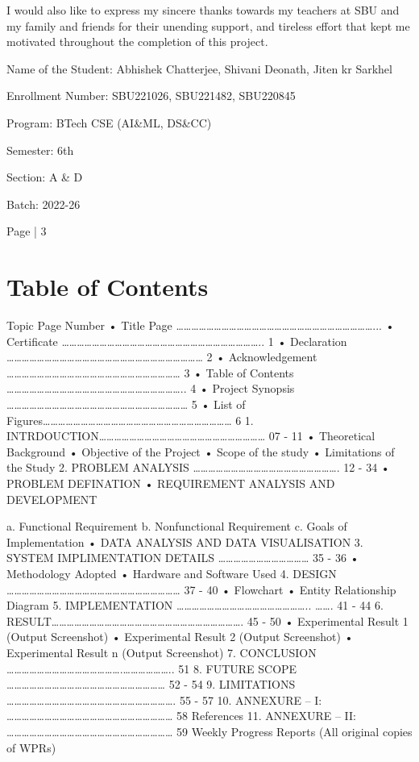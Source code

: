 \documentclass[11pt,a4paper]{article}
\begin{document}
I would also like to express my sincere thanks towards my teachers at SBU and my family and friends 
for their unending support, and tireless effort that kept me motivated throughout the completion of 
this project. 

Name of the Student:  Abhishek Chatterjee, Shivani Deonath, Jiten kr Sarkhel 

Enrollment Number:  SBU221026, SBU221482, SBU220845 

Program:  BTech CSE (AI\&ML, DS\&CC) 

Semester:  6th 

Section:  A \& D 

Batch:  2022-26 

Page | 3  

\newpage

\section*{Table of Contents }

{\large Topic  
          Page Number 
• Title Page ……………………………………………………………………...     
• Certificate ……………………………………………………………………..    1 
• Declaration ……………………………………………………………………    2 
• Acknowledgement ……………………………………………………………    3 
• Table of Contents ……………………………………………………………..    4 
• Project Synopsis ………………………………………………………………   5  
• List of Figures…………………………………………………………………    6 
1. 
INTRDOUCTION…………………………………………………………   07 - 11 
• 
Theoretical Background  
• 
Objective of the Project  
• 
Scope of the study 
• 
Limitations of the Study 
2. 
PROBLEM ANALYSIS ………………………………………………….   12 - 34 
• 
PROBLEM DEFINATION 
• 
REQUIREMENT ANALYSIS AND DEVELOPMENT }

a. Functional Requirement 
b. Nonfunctional Requirement 
c. Goals of Implementation 
• 
DATA ANALYSIS AND DATA VISUALISATION 
3. 
SYSTEM IMPLIMENTATION DETAILS ………………………………  35 - 36 
• 
Methodology Adopted 
• 
Hardware and Software Used 
4. 
DESIGN           ……………………………………………………………  37 - 40 
• 
Flowchart 
• 
Entity Relationship Diagram 
5. 
IMPLEMENTATION …………………………………………….. …….   41 - 44 
6. 
RESULT………………………………………………………………….    45 - 50 
• 
Experimental Result 1 (Output Screenshot) 
• 
Experimental Result 2 (Output Screenshot) 
• 
Experimental Result n (Output Screenshot) 
7. 
CONCLUSION ……………………………………….………………..      51  
8.      FUTURE SCOPE ………………………………………………………      52 - 54 
  9.      LIMITATIONS ………………………………………………………….     55 - 57 
 10.     ANNEXURE – I:  …………………………………………………………   58      
                References  
 11.     ANNEXURE – II:  …………………………………………………………  59      
                Weekly Progress Reports (All original copies of WPRs)  
\end{document}
